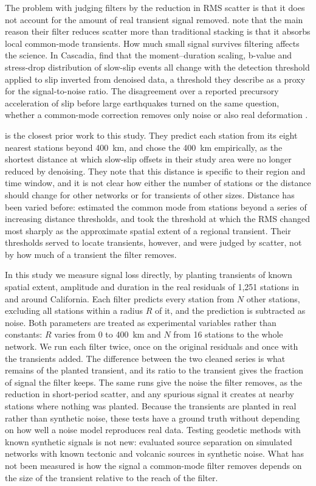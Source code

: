 \documentclass[preprint,12pt,authoryear]{elsarticle}
\begin{document}
The problem with judging filters by the reduction in RMS scatter is that it does not account for the amount of real transient signal removed. \citet{kreemer2021} note that the main reason their filter reduces scatter more than traditional stacking is that it absorbs local common-mode transients. How much small signal survives filtering affects the science. In Cascadia, \citet{costantino2026} find that the moment--duration scaling, b-value and stress-drop distribution of slow-slip events all change with the detection threshold applied to slip inverted from denoised data, a threshold they describe as a proxy for the signal-to-noise ratio. The disagreement over a reported precursory acceleration of slip before large earthquakes \citep{bletery2023} turned on the same question, whether a common-mode correction removes only noise or also real deformation \citep{bletery2025}.

\citet{bachelot2025} is the closest prior work to this study. They predict each station from its eight nearest stations beyond 400~km, and chose the 400~km empirically, as the shortest distance at which slow-slip offsets in their study area were no longer reduced by denoising. They note that this distance is specific to their region and time window, and it is not clear how either the number of stations or the distance should change for other networks or for transients of other sizes. Distance has been varied before: \citet{tianshen2016} estimated the common mode from stations beyond a series of increasing distance thresholds, and took the threshold at which the RMS changed most sharply as the approximate spatial extent of a regional transient. Their thresholds served to locate transients, however, and were judged by scatter, not by how much of a transient the filter removes.

In this study we measure signal loss directly, by planting transients of known spatial extent, amplitude and duration in the real residuals of 1,251 stations in and around California. Each filter predicts every station from $N$ other stations, excluding all stations within a radius $R$ of it, and the prediction is subtracted as noise. Both parameters are treated as experimental variables rather than constants: $R$ varies from 0 to 400~km and $N$ from 16 stations to the whole network. We run each filter twice, once on the original residuals and once with the transients added. The difference between the two cleaned series is what remains of the planted transient, and its ratio to the transient gives the fraction of signal the filter keeps. The same runs give the noise the filter removes, as the reduction in short-period scatter, and any spurious signal it creates at nearby stations where nothing was planted. Because the transients are planted in real rather than synthetic noise, these tests have a ground truth without depending on how well a noise model reproduces real data. Testing geodetic methods with known synthetic signals is not new: \citet{gualandi2016} evaluated source separation on simulated networks with known tectonic and volcanic sources in synthetic noise. What has not been measured is how the signal a common-mode filter removes depends on the size of the transient relative to the reach of the filter.
\end{document}
